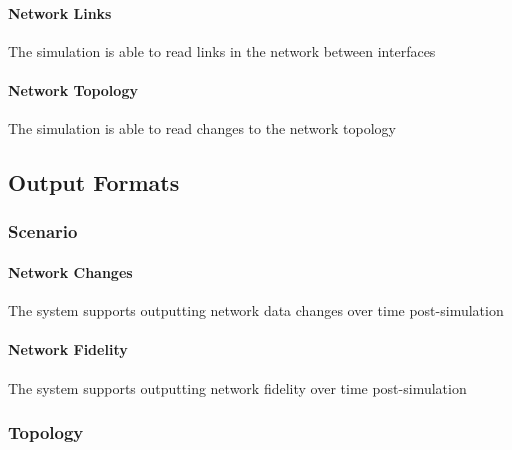 \documentclass[titlepage]{article}
\begin{document}
    \paragraph{Network Links} The simulation is able to read links in the network between interfaces
    \paragraph{Network Topology} The simulation is able to read changes to the network topology



\subsection{Output Formats%
  \label{output-formats}%
}
\subsubsection{Scenario}
    \paragraph{Network Changes} The system supports outputting network data changes over time post-simulation
    \paragraph{Network Fidelity} The system supports outputting network fidelity over time post-simulation

\subsubsection{Topology}
\end{document}
